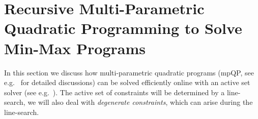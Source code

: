 \documentclass[journal]{IEEEtran}
\theoremstyle{remark}
\theoremstyle{definition}
\begin{document}
%
%
%
%
\section{Recursive Multi-Parametric Quadratic Programming to Solve Min-Max Programs}\label{sec:recursive:mpQP:via:line:search}


In this section we discuss how multi-parametric quadratic programs (mpQP, see e.g.~\cite{Tondel:2003,Bemporad:2002} 
for detailed discussions) can be solved efficiently online with an active set solver (see e.g.~\cite{Fletcher:2000}).
%
The active set of constraints will be determined by a line-search, we will also deal with \emph{degenerate
constraints}, which can arise during the line-search.
%
\end{document}
